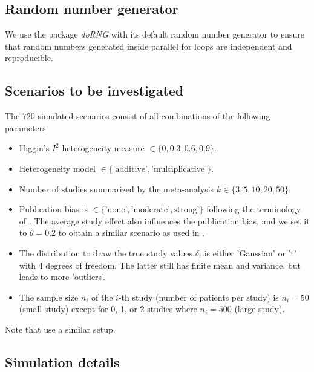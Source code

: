 \documentclass[letterpaper, 12pt]{article}
\newcommand{\pkg}[1]{\textit{#1}}
\begin{document}
\subsection{Random number generator}
We use the package \pkg{doRNG} with its default random number generator to ensure that random numbers generated inside parallel for loops are independent and reproducible.


\subsection{Scenarios to be investigated} \label{sec:scenario}
The $720$ simulated scenarios consist of all combinations of the following parameters:
\begin{itemize}
\item Higgin's $I^2$ heterogeneity measure $\in \{0, 0.3, 0.6, 0.9\}$.
\item Heterogeneity model $\in \{\text{'additive'}, \text{'multiplicative'}\}$.
\item Number of studies summarized by the meta-analysis $k \in \{3, 5, 10, 20, 50\}$.
\item Publication bias is  $\in \{\text{'none'}, \text{'moderate'}, \text{strong'}\}$ following the terminology of \citet{henm:copa:10}.
  The average study effect also influences the publication bias, and we set it to $\theta = 0.2$ to obtain a similar scenario as used in \citet{henm:copa:10}.
\item The distribution to draw the true study values $\delta_i$ is either 'Gaussian' or 't' with 4 degrees of freedom. The latter still has finite mean and variance, but leads to more 'outliers'.
\item The sample size $n_i$ of the $i$-th study (number of patients per study) is $n_i = 50$ (small study) except for 0, 1, or 2 studies where $n_i=500$ (large study). 
\end{itemize}
Note that \citet{IntHoutIoannidis} use a similar setup.

\subsection{Simulation details}
\end{document}
